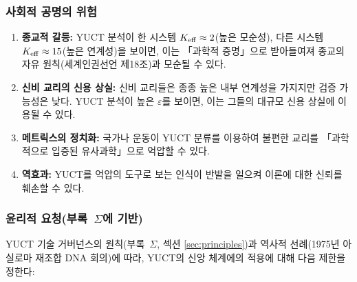 \documentclass[11pt,a4paper]{article}
\newcommand{\eps}{\varepsilon}
\begin{document}
	\subsubsection{사회적 공명의 위험}
	
	\begin{enumerate}
		\item \textbf{종교적 갈등:} YUCT 분석이 한 시스템 $\Keff \approx 2$(높은 모순성), 다른 시스템 $\Keff \approx 15$(높은 연계성)을 보이면, 이는 「과학적 증명」으로 받아들여져 종교의 자유 원칙(세계인권선언 제18조)과 모순될 수 있다.
		
		\item \textbf{신비 교리의 신용 상실:} 신비 교리들은 종종 높은 내부 연계성을 가지지만 검증 가능성은 낮다. YUCT 분석이 높은 $\eps$를 보이면, 이는 그들의 대규모 신용 상실에 이용될 수 있다.
		
		\item \textbf{메트릭스의 정치화:} 국가나 운동이 YUCT 분류를 이용하여 불편한 교리를 「과학적으로 입증된 유사과학」으로 억압할 수 있다.
		
		\item \textbf{역효과:} YUCT를 억압의 도구로 보는 인식이 반발을 일으켜 이론에 대한 신뢰를 훼손할 수 있다.
	\end{enumerate}
	
	\subsubsection{윤리적 요청(부록~$\Sigma$에 기반)}
	
	YUCT 기술 거버넌스의 원칙(부록~$\Sigma$, 섹션 \ref{sec:principles})과 역사적 선례(1975년 아실로마 재조합 DNA 회의)에 따라, YUCT의 신앙 체계에의 적용에 대해 다음 제한을 정한다:
	
\end{document}
